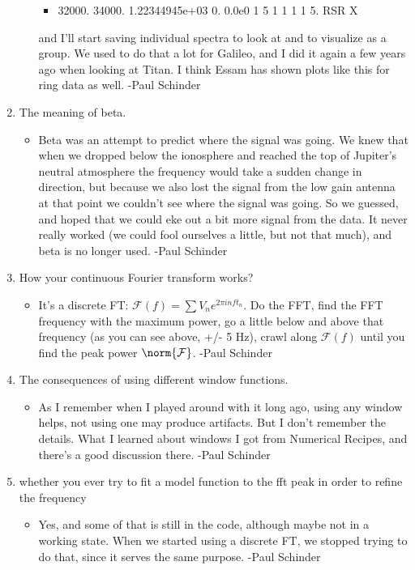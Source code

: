 \documentclass[crop=false,class=article,oneside]{standalone}
\begin{document}
\begin{enumerate}
\begin{itemize}
        \begin{itemize}
            \item 32000. 34000. 1.22344945e+03 0. 0.0e0 1 5 1 1 1 1 5. RSR X
        \end{itemize}
        and I’ll start saving individual spectra to look at and to visualize as a group.  We used to do that a lot for Galileo, and I did it again a few years ago when looking at Titan.  I think Essam has shown plots like this for ring data as well. -Paul Schinder
    \end{itemize}
    \item The meaning of beta.
    \begin{itemize}
        \item Beta was an attempt to predict where the signal was going.  We knew that when we dropped below the ionosphere and reached the top of Jupiter’s neutral atmosphere the frequency would take a sudden change in direction, but because we also lost the signal from the low gain antenna at that point we couldn’t see where the signal was going.  So we guessed, and hoped that we could eke out a bit more signal from the data.  It never really worked (we could fool ourselves a little, but not that much), and beta is no longer used. -Paul Schinder
    \end{itemize}
    \item How your continuous Fourier transform works?
    \begin{itemize}
        \item It’s a discrete FT: $\mathcal{F}(f) = \sum V_n e^{2\pi i n f t_n}$. Do the FFT, find the FFT frequency with the maximum power, go a little below and above that frequency (as you can see above, +/- 5 Hz), crawl along $\mathcal{F}(f)$ until you find the peak power $\norm{\mathcal{F}}$. -Paul Schinder
    \end{itemize}
    \item The consequences of using different window functions.
    \begin{itemize}
        \item As I remember when I played around with it long ago, using any window helps, not using one may produce artifacts.  But I don’t remember the details.  What I learned about windows I got from Numerical Recipes, and there’s a good discussion there. -Paul Schinder
    \end{itemize}
    \item whether you ever try to fit a model function to the fft peak in order to refine the frequency
    \begin{itemize}
        \item Yes, and some of that is still in the code, although maybe not in a working state.  When we started using a discrete FT, we stopped trying to do that, since it serves the same purpose. -Paul Schinder
    \end{itemize}
\end{enumerate}
\end{document}

